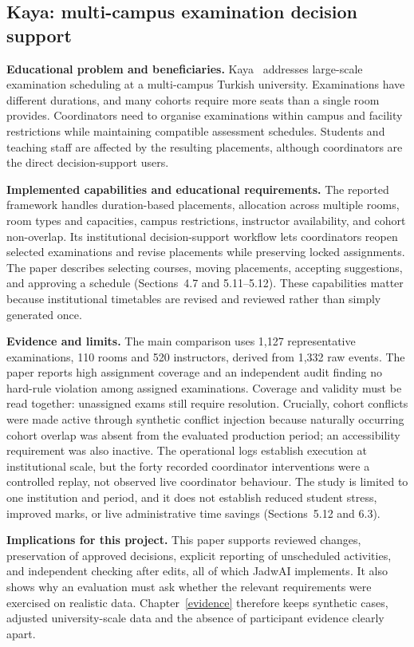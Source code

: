 \subsection{Kaya: multi-campus examination decision support}
\textbf{Educational problem and beneficiaries.} Kaya~\cite{kaya2026drl} addresses large-scale examination scheduling at a multi-campus Turkish university. Examinations have different durations, and many cohorts require more seats than a single room provides. Coordinators need to organise examinations within campus and facility restrictions while maintaining compatible assessment schedules. Students and teaching staff are affected by the resulting placements, although coordinators are the direct decision-support users.

\textbf{Implemented capabilities and educational requirements.} The reported framework handles duration-based placements, allocation across multiple rooms, room types and capacities, campus restrictions, instructor availability, and cohort non-overlap. Its institutional decision-support workflow lets coordinators reopen selected examinations and revise placements while preserving locked assignments. The paper describes selecting courses, moving placements, accepting suggestions, and approving a schedule (Sections~4.7 and 5.11--5.12). These capabilities matter because institutional timetables are revised and reviewed rather than simply generated once.

\textbf{Evidence and limits.} The main comparison uses 1,127 representative examinations, 110 rooms and 520 instructors, derived from 1,332 raw events. The paper reports high assignment coverage and an independent audit finding no hard-rule violation among assigned examinations. Coverage and validity must be read together: unassigned exams still require resolution. Crucially, cohort conflicts were made active through synthetic conflict injection because naturally occurring cohort overlap was absent from the evaluated production period; an accessibility requirement was also inactive. The operational logs establish execution at institutional scale, but the forty recorded coordinator interventions were a controlled replay, not observed live coordinator behaviour. The study is limited to one institution and period, and it does not establish reduced student stress, improved marks, or live administrative time savings (Sections~5.12 and 6.3).

\textbf{Implications for this project.} This paper supports reviewed changes, preservation of approved decisions, explicit reporting of unscheduled activities, and independent checking after edits, all of which JadwAI implements. It also shows why an evaluation must ask whether the relevant requirements were exercised on realistic data. Chapter~\ref{evidence} therefore keeps synthetic cases, adjusted university-scale data and the absence of participant evidence clearly apart.

